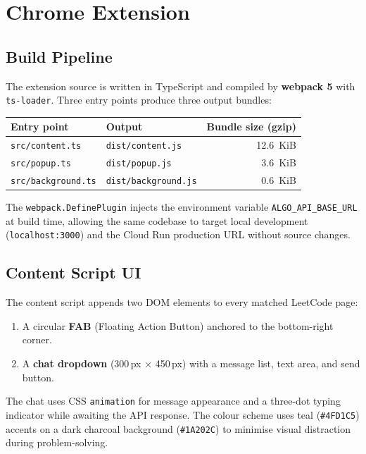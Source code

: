 \documentclass[11pt,a4paper]{article}
\begin{document}
\section{Chrome Extension}

\subsection{Build Pipeline}

The extension source is written in TypeScript and compiled by \textbf{webpack 5}
with \texttt{ts-loader}.  Three entry points produce three output bundles:

\begin{center}
\begin{tabular}{llr}
  \toprule
  \textbf{Entry point} & \textbf{Output} & \textbf{Bundle size (gzip)} \\
  \midrule
  \texttt{src/content.ts}    & \texttt{dist/content.js}    & 12.6~KiB \\
  \texttt{src/popup.ts}      & \texttt{dist/popup.js}      &  3.6~KiB \\
  \texttt{src/background.ts} & \texttt{dist/background.js} &  0.6~KiB \\
  \bottomrule
\end{tabular}
\end{center}

The \texttt{webpack.DefinePlugin} injects the environment variable
\texttt{ALGO\_API\_BASE\_URL} at build time, allowing the same codebase to target
local development (\texttt{localhost:3000}) and the Cloud Run production URL without
source changes.

\subsection{Content Script UI}

The content script appends two DOM elements to every matched LeetCode page:

\begin{enumerate}[noitemsep]
  \item A circular \textbf{FAB} (Floating Action Button) anchored to the
        bottom-right corner.
  \item A \textbf{chat dropdown} (300\,px $\times$ 450\,px) with a message list,
        text area, and send button.
\end{enumerate}

The chat uses CSS \texttt{animation} for message appearance and a three-dot
typing indicator while awaiting the API response.  The colour scheme uses
teal (\texttt{\#4FD1C5}) accents on a dark charcoal background
(\texttt{\#1A202C}) to minimise visual distraction during problem-solving.
\end{document}
